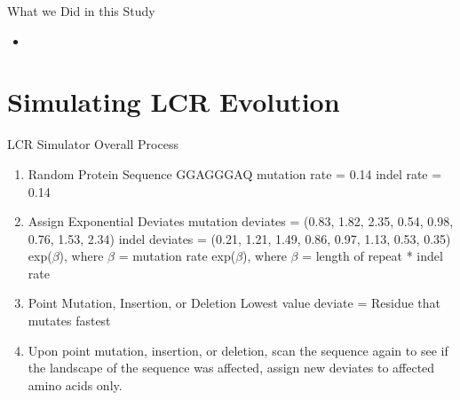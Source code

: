 \documentclass{beamer}
\begin{document}
	\begin{frame}{What we Did in this Study}
		\begin{itemize}
			\item 
		\end{itemize}
	\end{frame}

	\section{Simulating LCR Evolution}
	
	\begin{frame}{LCR Simulator Overall Process}
		\begin{center}
			\begin{enumerate}
				\item Random Protein Sequence \newline	
				GGAGGGAQ \newline		
				mutation rate = 0.14
				indel rate = 0.14  \newline\pause
				
				\item Assign Exponential Deviates \newline
				mutation deviates = (0.83, 1.82, 2.35, 0.54, 0.98, 0.76, 1.53, 2.34) \newline
				indel deviates = (0.21, 1.21, 1.49, 0.86, 0.97, 1.13, 0.53, 0.35) \newline
				\qquad exp($\beta$), where $\beta$ = mutation rate\newline 
				\qquad exp($\beta$), where $\beta$ = length of repeat * indel rate \newline \pause
				
				\item Point Mutation, Insertion, or Deletion \newline
				Lowest value deviate = Residue that mutates fastest \newline \pause
				
				\item Upon point mutation, insertion, or deletion, scan the sequence again to see if the landscape of the sequence was affected, assign new deviates to affected amino acids only.
				
			\end{enumerate}
		\end{center}	
	\end{frame}
\end{document}
